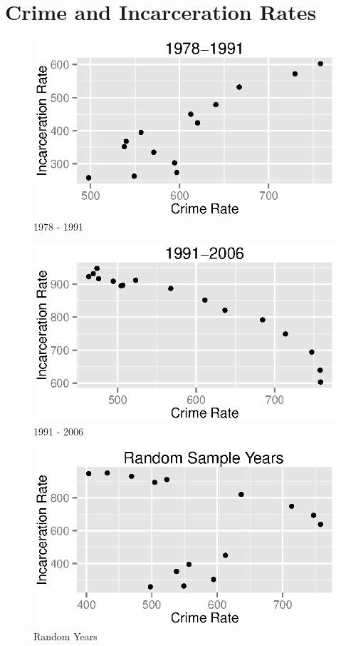 \documentclass{exam}
\begin{document}
  \section{Crime and Incarceration Rates}

  \begin{figure}[H]
    \centering
    \includegraphics{figures/crime/crime_vs_incarceration_1978-1991.eps}
    \caption{1978 - 1991}
  \end{figure}

  \begin{figure}[H]
    \centering
    \includegraphics{figures/crime/crime_vs_incarceration_1991-2006.eps}
    \caption{1991 - 2006}
  \end{figure}

  \begin{figure}[H]
    \centering
    \includegraphics{figures/crime/crime_vs_incarceration_sample.eps}
    \caption{Random Years}
  \end{figure}
\end{document}
